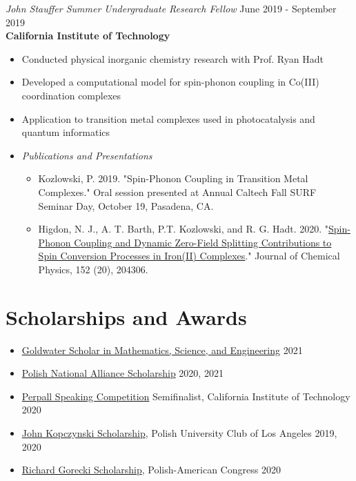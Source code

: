 \documentclass[margin,line]{resume}
\begin{document}
\begin{resume}
{\sl John Stauffer Summer Undergraduate Research Fellow} \hfill June 2019 - September 2019 \\
\textbf{California Institute of Technology}
\begin{itemize}
\item Conducted physical inorganic chemistry research with Prof. Ryan Hadt
\item Developed a computational model for spin-phonon coupling in Co(III)
coordination complexes
\item Application to transition metal complexes used in photocatalysis and quantum informatics
\item \emph{Publications and Presentations}
    \begin{itemize}
            \item Kozlowski, P. 2019. "Spin-Phonon Coupling in Transition Metal Complexes." Oral session presented at Annual Caltech Fall SURF Seminar Day, October 19, Pasadena, CA.
    \item Higdon, N. J., A. T. Barth, P.T. Kozlowski, and R. G. Hadt. 2020. "\href{https://doi.org/10.1063/5.0006361}{Spin-Phonon Coupling and Dynamic Zero-Field Splitting Contributions to Spin Conversion Processes in Iron(II) Complexes}." Journal of Chemical Physics, 152 (20), 204306.
    \end{itemize}
\end{itemize}
\section{\mysidestyle Scholarships and Awards}
\begin{itemize}
    \item  \textnormal{\href{https://goldwaterscholarship.gov/}{Goldwater Scholar in Mathematics, Science, and Engineering}} \hfill 2021
    \item \textnormal{\href{https://pna-znp.org/fraternal-benefits/the-pna-scholarship-award-program-for-academic-year-2022-2023-is-now-open/}{Polish National Alliance Scholarship}} \hfill 2020, 2021
    \item \textnormal{\href{https://www.caltech.edu/campus-life-events/calendar/perpal-surf-speaking-competition-finals-89788}{Perpall Speaking Competition} Semifinalist, California Institute of Technology} \hfill 2020
    \item \textnormal{\href{https://www.pucla.org/name-scholarships/}{John Kopczynski Scholarship}, Polish University Club of Los Angeles} \hfill 2019, 2020
    \item \textnormal{\href{https://www.paccf.org/richard-gorecki-scholarship1}{Richard Gorecki Scholarship}, Polish-American Congress} \hfill 2020
\end{itemize}


\end{resume}
\end{document}
